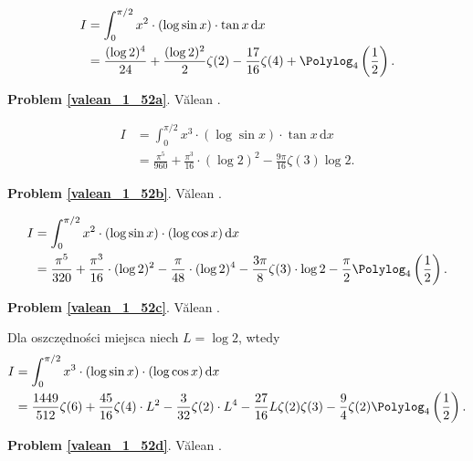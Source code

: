 %

\begin{problem_with_solution}
    \label{valean_1_52a}%
    \begin{align}
        I & = \int_0^{\pi/2} x^2 \cdot (\log \sin x) \cdot \tan x\,\mathrm{d}x \\
        & = \frac{(\log 2)^4}{24} + \frac{(\log 2)^2}{2} \zeta(2) - \frac{17}{16} \zeta(4) + \Polylog_4 \left(\frac 12\right).
    \end{align}
\end{problem_with_solution}


\textbf{Problem \ref{valean_1_52a}}.
Vălean \cite[s. 33]{nahin15}.


\begin{problem_with_solution}
    \label{valean_1_52b}%
    \begin{align}
        I & = \int_0^{\pi/2} x^3 \cdot (\log \sin x) \cdot \tan x \,\mathrm{d}x \\
        & = \frac{\pi^5}{960} + \frac{\pi^3}{16} \cdot (\log 2)^2 - \frac {9 \pi}{16} \zeta (3) \log 2.
    \end{align}
\end{problem_with_solution}


\textbf{Problem \ref{valean_1_52b}}.
Vălean \cite[s. 33]{nahin15}.


\begin{problem_with_solution}
    \label{valean_1_52c}%
    \begin{align}
        I & = \int_0^{\pi/2} x^2 \cdot (\log \sin x) \cdot (\log \cos x) \,\mathrm{d}x \\
        & = \frac{\pi^5}{320} + \frac{\pi^3}{16} \cdot (\log 2)^2 - \frac{\pi}{48} \cdot (\log 2)^4 - \frac{3 \pi}{8} \zeta(3) \cdot \log 2 - \frac{\pi} 2 \Polylog_4 \left(\frac 1 2\right).
    \end{align}
\end{problem_with_solution}


\textbf{Problem \ref{valean_1_52c}}.
Vălean \cite[s. 33]{nahin15}.


\begin{problem_with_solution}
    \label{valean_1_52d}%
    Dla oszczędności miejsca niech $L = \log 2$, wtedy
    \begin{align}
        I & = \int_0^{\pi/2} x^3 \cdot (\log \sin x) \cdot (\log \cos x) \,\mathrm{d}x \\
        & = \frac{1449}{512} \zeta(6) + \frac{45}{16} \zeta(4) \cdot L^2 - \frac{3}{32} \zeta(2) \cdot L^4 - \frac{27}{16} L \zeta(2) \zeta(3) - \frac 9 4 \zeta(2) \Polylog_4 \left(\frac 1 2\right).
    \end{align}
\end{problem_with_solution}


\textbf{Problem \ref{valean_1_52d}}.
Vălean \cite[s. 33]{nahin15}.


%